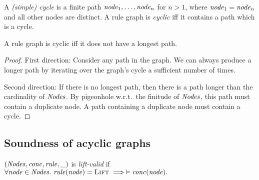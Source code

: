 \begin{definition}
    A \emph{(simple) cycle} is a finite path $\mathit{node}_1,\dots,\mathit{node}_n$
    for $n>1$,
    where $\mathit{node}_1 = \mathit{node}_n$ and all other nodes are distinct.
    A rule graph is \emph{cyclic}
    iff it contains a path which is a cycle.
\end{definition}


\begin{lemma}
    \label{lem:cyclic-iff-no-longest-path}
    A rule graph is cyclic iff
    it does not have a longest path.
\end{lemma}
\begin{proof}
First direction:
Consider any path in the graph.
We can always produce a longer path by iterating over the graph's cycle a sufficient number of times.

Second direction:
If there is no longest path, then there is a path longer than the cardinality of $\mathit{Nodes}$. By pigeonhole w.r.t.\ the finitude of $\mathit{Nodes}$,
this path must contain a duplicate node.
A path containing a duplicate node must contain a cycle.
\end{proof}

\newcommand{\restrict}[2]{%
    #1 {\mid_{#2}} %
}

\iffalse
\begin{definition}
    The \emph{subgraph} of a graph $G=(\DomNode,\MapConc,\MapRule,\MapPrems)$ w.r.t.\ $\node \in \DomNode$
    is 
    \\
    $G'=(
        \DomNode',\
        \restrict\MapConc{\DomNode'},\
        \restrict\MapRule{\DomNode'},\
        \restrict\MapPrems{\DomNode'}
    )$,
    where $\DomNode' = 
        \SetBuild(\node' \in \DomNode | \reaches{\node}{\node'}{G})$.
\end{definition}

\begin{lemma}
Any subgraph is well-defined according to the definition of graph.
\end{lemma}
\fi

\subsection{Soundness of acyclic graphs}

\begin{definition}
$(\mathit{Nodes},\mathit{conc},\mathit{rule},\_)$ is \emph{lift-valid}
if
\(
    \forall \mathit{node} \in \mathit{Nodes}.\ \mathit{rule}(\mathit{node}) = \textsc{Lift} \implies
    \vDash \mathit{conc}(\mathit{node}).
\)
\end{definition}

